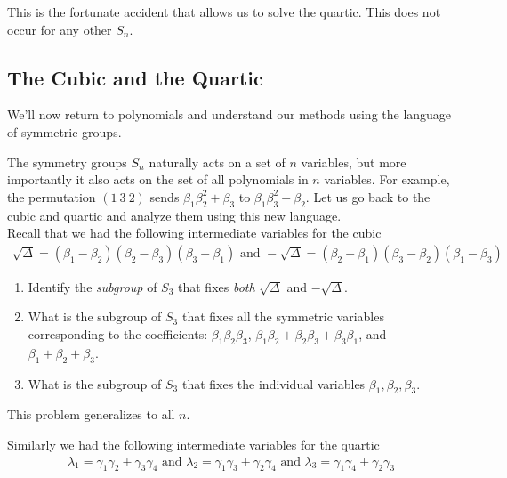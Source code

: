 This is the fortunate accident that allows us to solve the quartic. This does not occur for any other $ S_n$.






\newpage
\subsection{The Cubic and the Quartic}
We'll now return to polynomials and understand our methods using the language of symmetric groups.

The symmetry groups $ S_n$ naturally acts on a set of $ n$ variables, but more importantly it also acts on the set of all polynomials in $ n$ variables. For example, the permutation $ (1 \: 3 \: 2)$ sends $ \beta_1 \beta_2^2 +  \beta_3 $ to $ \beta_1 \beta_3^2 +  \beta_2 $. Let us go back to the cubic and quartic and analyze them using this new language.\\


Recall that we had the following intermediate variables for the cubic
  \begin{align*}
    \sqrt{\Delta} = (\beta_1 -\beta_2)(\beta_2 - \beta_3)(\beta_3 - \beta_1) \mbox{ and } -\sqrt{\Delta} = (\beta_2 -\beta_1)(\beta_3 - \beta_2)(\beta_1 - \beta_3)
  \end{align*}

\begin{questions}[resume]
  \item \begin{enumerate}
  \label{ques:cubic}
    \item Identify the \emph{subgroup} of $ S_3$ that fixes \emph{both} $\sqrt{\Delta} $ and $-\sqrt{\Delta}$.
    \item What is the subgroup of $ S_3$ that fixes all the symmetric variables corresponding to the coefficients: $ \beta_1 \beta_2 \beta_3$, $\beta_1 \beta_2 + \beta_2 \beta_3 + \beta_3 \beta_1$, and $\beta_1 + \beta_2 + \beta_3$.
    \item What is the subgroup of $ S_3$ that fixes the individual variables $\beta_1 , \beta_2,  \beta_3 $.
  \end{enumerate}
  This problem generalizes to all $ n$.
\end{questions}

Similarly we had the following intermediate variables for the quartic
  \begin{align*}
    \lambda_1 = \gamma_1 \gamma_2 + \gamma_3 \gamma_4 
    \mbox{ and } \lambda_2 = \gamma_1 \gamma_3 + \gamma_2 \gamma_4
    \mbox{ and } \lambda_3 = \gamma_1 \gamma_4 + \gamma_2 \gamma_3 
  \end{align*}

